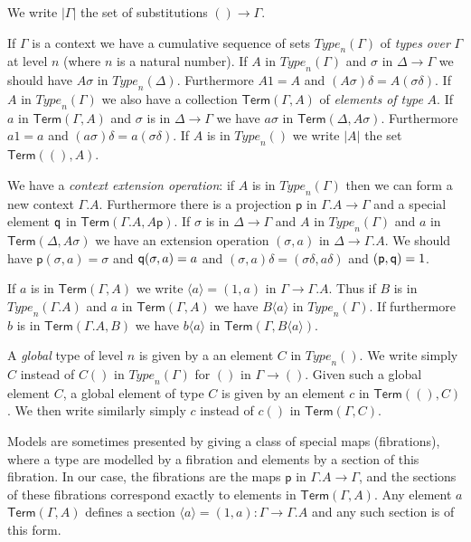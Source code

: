 \documentclass[10pt,a4paper]{article}
\newcommand{\pp}{\mathsf{p}}
\def\Type{{Type}}
\newcommand{\subst}[1]{{\langle}#1{\rangle}}
\newcommand{\Elem}{\mathsf{Term}}
\newcommand{\id}{{1}}
\newcommand{\qq}{{\sf q}}
\begin{document}
We write $|\Gamma|$ the set of substitutions $()\rightarrow\Gamma$.

\medskip

If $\Gamma$ is a context we have a cumulative sequence of sets $\Type_n(\Gamma)$
of {\em types over} $\Gamma$ at level $n$ (where $n$ is a natural number).
If $A$ in $\Type_n(\Gamma)$ and $\sigma$ in $\Delta\rightarrow\Gamma$ 
we should have $A\sigma$ in $\Type_n(\Delta)$.
Furthermore $A\id = A$ and $(A\sigma)\delta = A(\sigma\delta)$.
If $A$ in $\Type_n(\Gamma)$ we also have a collection $\Elem(\Gamma,A)$
of {\em elements of type} $A$.
If $a$ in $\Elem(\Gamma,A)$
and $\sigma$ is in $\Delta\rightarrow\Gamma$ 
we have $a\sigma$ in $\Elem(\Delta,A\sigma)$. Furthermore
$a\id = a$ and $(a\sigma)\delta = a(\sigma\delta)$.
If $A$ is in $\Type_n()$ we write $|A|$ the set $\Elem((),A)$. 

 We have a {\em context extension operation}: if $A$ is in $\Type_n(\Gamma)$ then we can
form a new context $\Gamma.A$. Furthermore there is a projection
$\pp$ in $\Gamma.A\rightarrow \Gamma$ and a special element
$\qq$ in $\Elem(\Gamma.A,A\pp)$. If $\sigma$ is in $\Delta\rightarrow \Gamma$ and
$A$ in $\Type_n(\Gamma)$ and $a$ in $\Elem(\Delta,A\sigma)$ we have
an extension operation $(\sigma,a)$ in $\Delta\rightarrow \Gamma.A$.
We should have $\pp (\sigma,a) = \sigma$ and $\qq (\sigma,a) = a$ and
$(\sigma,a)\delta = (\sigma\delta,a\delta)$ and $(\pp,\qq) = \id$.

 If $a$ is in $\Elem(\Gamma,A)$ we write $\subst{a}= (\id,a)$ in $\Gamma\rightarrow \Gamma.A$.
Thus if $B$ is in $\Type_n(\Gamma.A)$ and $a$ in $\Elem(\Gamma,A)$ 
we have $B\subst{a}$ in $\Type_n(\Gamma)$.
If furthermore $b$ is in $\Elem(\Gamma.A,B)$ we have $b\subst{a}$ in $\Elem(\Gamma,B\subst{a})$. 

\medskip

 A {\em global} type of level $n$ is given by a an element $C$ in $\Type_n()$.
We write simply $C$ instead of $C()$ in $\Type_n(\Gamma)$ for $()$ in $\Gamma\rightarrow ()$.
Given such a global element $C$, a global element of type $C$ is given by 
an element $c$ in $\Elem((),C)$. We then write similarly
simply $c$ instead of $c()$ in $\Elem(\Gamma,C)$.

Models are sometimes presented by giving a class of special maps (fibrations), where a type
are modelled by a fibration and elements by a section of this fibration. In our case, the fibrations
are the maps $\pp$ in $\Gamma.A\rightarrow \Gamma$, and the sections of these fibrations
correspond exactly to elements in $\Elem(\Gamma,A)$.
Any element $a$ $\Elem(\Gamma,A)$ defines a section $\subst{a} = (\id,a):\Gamma\rightarrow\Gamma.A$
and any such section is of this form.
\end{document}
